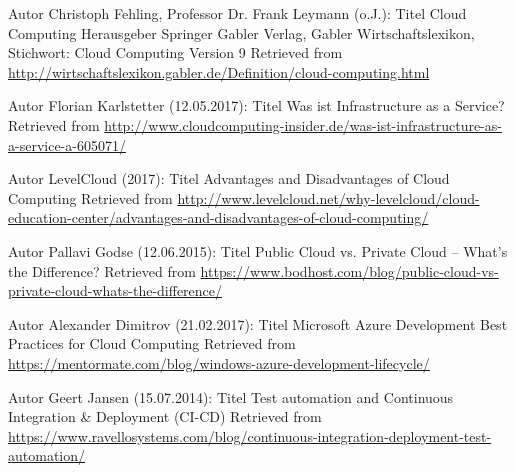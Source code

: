 



\begin{thebibliography}{..........}
   Autor Christoph Fehling, Professor Dr. Frank Leymann  (o.J.):
                            Titel	Cloud Computing
                            Herausgeber	Springer Gabler Verlag, Gabler Wirtschaftslexikon, Stichwort: Cloud Computing
                            Version 9
                            Retrieved from \url{http://wirtschaftslexikon.gabler.de/Definition/cloud-computing.html}
                              
   Autor Florian Karlstetter (12.05.2017):
                        	Titel	Was ist Infrastructure as a Service?
                         	Retrieved from \url{http://www.cloudcomputing-insider.de/was-ist-infrastructure-as-a-service-a-605071/}
  							

  	 Autor LevelCloud (2017):
  							Titel	Advantages and Disadvantages of Cloud Computing
  							Retrieved from \url{http://www.levelcloud.net/why-levelcloud/cloud-education-center/advantages-and-disadvantages-of-cloud-computing/}
  
  	Autor Pallavi Godse (12.06.2015):
  							Titel	Public Cloud vs. Private Cloud – What’s the Difference?
  							Retrieved from \url{https://www.bodhost.com/blog/public-cloud-vs-private-cloud-whats-the-difference/}				
						

    Autor	Alexander Dimitrov (21.02.2017):
                            Titel	Microsoft Azure Development Best Practices for Cloud Computing 
                            Retrieved from \url{https://mentormate.com/blog/windows-azure-development-lifecycle/}   
                            
     Autor	Geert Jansen (15.07.2014):
                            Titel	Test automation and Continuous Integration \& Deployment (CI-CD)
                            Retrieved from \url{ https://www.ravellosystems.com/blog/continuous-integration-deployment-test-automation/} 
                    

\end{thebibliography}
